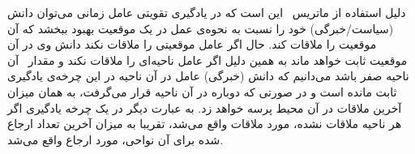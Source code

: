 دلیل استفاده از ماتریس \ این است که در یادگیری تقویتی عامل زمانی می‌توان دانش (سیاست/خبرگی) خود را نسبت به نحوه‌ی عمل در یک موقعیت بهبود ببخشد که آن موقعیت را ملاقات کند. حال اگر عامل موقعیتی را ملاقات نکند دانش وی در آن موقعیت ثابت خواهد ماند به همین دلیل اگر عامل ناحیه‌ای را ملاقات نکند و مقدار \ آن ناحیه صفر باشد می‌دانیم که دانش (خبرگی) عامل در آن ناحیه در این چرخه‌ی یادگیری ثابت مانده است و در صورتی که دوباره در آن ناحیه قرار می‌گرفت،  به همان میزان آخرین ملاقات در آن محیط پرسه خواهد زد. به عبارت دیگر در یک چرخه یادگیری اگر هر ناحیه ملاقات نشده، مورد ملاقات واقع می‌شد، تقریبا به میزان آخرین تعداد ارجاع شده برای آن نواحی، مورد ارجاع واقع می‌شد.